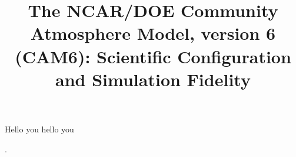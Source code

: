 \documentclass[linenumbers]{agujournal2018}
\begin{document}
\title{The NCAR/DOE Community Atmosphere Model, version 6 (CAM6): Scientific Configuration and Simulation Fidelity}



\linenumbers
\modulolinenumbers[1]
Hello you hello you















%

.


%



%
\end{document}
